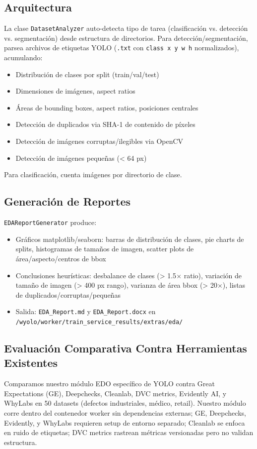 \documentclass[10pt,twocolumn,letterpaper]{article}
\begin{document}
\subsection{Arquitectura}
La clase \texttt{DatasetAnalyzer} auto-detecta tipo de tarea (clasificación vs. detección vs. segmentación) desde estructura de directorios. Para detección/segmentación, parsea archivos de etiquetas YOLO (\texttt{.txt} con \texttt{class x y w h} normalizados), acumulando:
\begin{itemize}
    \item Distribución de clases por split (train/val/test)
    \item Dimensiones de imágenes, aspect ratios
    \item Áreas de bounding boxes, aspect ratios, posiciones centrales
    \item Detección de duplicados via SHA-1 de contenido de píxeles
    \item Detección de imágenes corruptas/ilegibles via OpenCV
    \item Detección de imágenes pequeñas (< 64 px)
\end{itemize}
Para clasificación, cuenta imágenes por directorio de clase.

\subsection{Generación de Reportes}
\texttt{EDAReportGenerator} produce:
\begin{itemize}
    \item Gráficos matplotlib/seaborn: barras de distribución de clases, pie charts de splits, histogramas de tamaños de imagen, scatter plots de área/aspecto/centros de bbox
    \item Conclusiones heurísticas: desbalance de clases (> 1.5$\times$ ratio), variación de tamaño de imagen (> 400 px rango), varianza de área bbox (> 20$\times$), listas de duplicados/corruptas/pequeñas
    \item Salida: \texttt{EDA\_Report.md} y \texttt{EDA\_Report.docx} en \texttt{/wyolo/worker/train\_service\_results/extras/eda/}
\end{itemize}

\subsection{Evaluación Comparativa Contra Herramientas Existentes}
Comparamos nuestro módulo EDO específico de YOLO contra Great Expectations (GE), Deepchecks, Cleanlab, DVC metrics, Evidently AI, y WhyLabs en 50 datasets (defectos industriales, médico, retail). Nuestro módulo corre dentro del contenedor worker sin dependencias externas; GE, Deepchecks, Evidently, y WhyLabs requieren setup de entorno separado; Cleanlab se enfoca en ruido de etiquetas; DVC metrics rastrean métricas versionadas pero no validan estructura.
\end{document}
